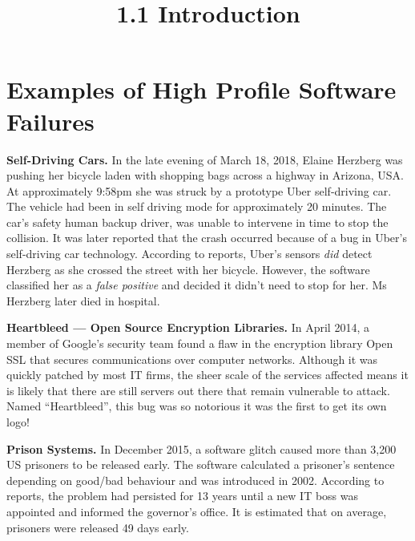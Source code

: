 



\title{1.1 Introduction}


\section{Examples of High Profile Software Failures}

{\bf Self-Driving Cars.}
In the late evening of March 18, 2018, Elaine Herzberg was pushing her bicycle
laden with shopping bags across a highway in Arizona, USA. At approximately
9:58pm she was struck by a prototype Uber self-driving car. The vehicle had been
in self driving mode for approximately 20 minutes. The car's safety human backup
driver, was unable to intervene in time to stop the collision. It was later
reported that the crash occurred because of a bug in Uber's self-driving car
technology. According to reports, Uber's sensors {\it did} detect Herzberg as
she crossed the street with her bicycle. However, the software classified her as
a {\it false positive} and decided it didn't need to stop for her. Ms Herzberg
later died in hospital.

{\bf Heartbleed --- Open Source Encryption Libraries.}
In April 2014, a member of Google's security team found a flaw in the encryption
library Open SSL that secures communications over computer networks. Although it
was quickly patched by most IT firms, the sheer scale of the services affected
means it is likely that there are still servers out there that remain vulnerable
to attack. Named ``Heartbleed'', this bug was so notorious it was the first to
get its own logo!

{\bf Prison Systems.}
In December 2015, a software glitch caused more than 3,200 US prisoners to be
released early. The software calculated a prisoner's sentence depending on
good/bad behaviour and was introduced in 2002. According to reports, the problem
had persisted for 13 years until a new IT boss was appointed and informed
the governor's office. It is estimated that on average, prisoners were released
49 days early.

